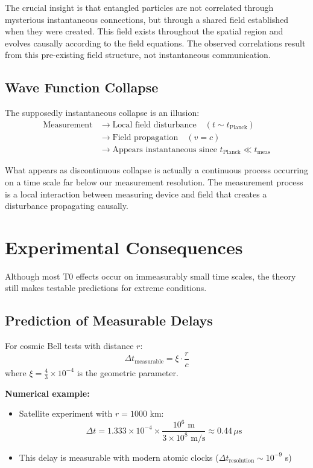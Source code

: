 \documentclass[12pt,a4paper]{article}
\begin{document}
	The crucial insight is that entangled particles are not correlated through mysterious instantaneous connections, but through a shared field established when they were created. This field exists throughout the spatial region and evolves causally according to the field equations. The observed correlations result from this pre-existing field structure, not instantaneous communication.
	
	\subsection{Wave Function Collapse}
	
	The supposedly instantaneous collapse is an illusion:
	\begin{align}
		\text{Measurement} &\rightarrow \text{Local field disturbance} \quad (t \sim t_{\text{Planck}}) \\
		&\rightarrow \text{Field propagation} \quad (v = c) \\
		&\rightarrow \text{Appears instantaneous since } t_{\text{Planck}} \ll t_{\text{meas}}
	\end{align}
	
	What appears as discontinuous collapse is actually a continuous process occurring on a time scale far below our measurement resolution. The measurement process is a local interaction between measuring device and field that creates a disturbance propagating causally.
	
	\section{Experimental Consequences}
	
	Although most T0 effects occur on immeasurably small time scales, the theory still makes testable predictions for extreme conditions.
	
	\subsection{Prediction of Measurable Delays}
	
	For cosmic Bell tests with distance $r$:
	\begin{equation}
		\Delta t_{\text{measurable}} = \xi \cdot \frac{r}{c}
	\end{equation}
	where $\xi = \frac{4}{3} \times 10^{-4}$ is the geometric parameter.
	
	\textbf{Numerical example:}
	\begin{itemize}
		\item Satellite experiment with $r = 1000$ km:
		\begin{equation}
			\Delta t = 1.333 \times 10^{-4} \times \frac{10^6 \text{ m}}{3 \times 10^8 \text{ m/s}} \approx 0.44 \, \mu\text{s}
		\end{equation}
		\item This delay is measurable with modern atomic clocks ($\Delta t_{\text{resolution}} \sim 10^{-9}$ s)
	\end{itemize}
	
\end{document}
